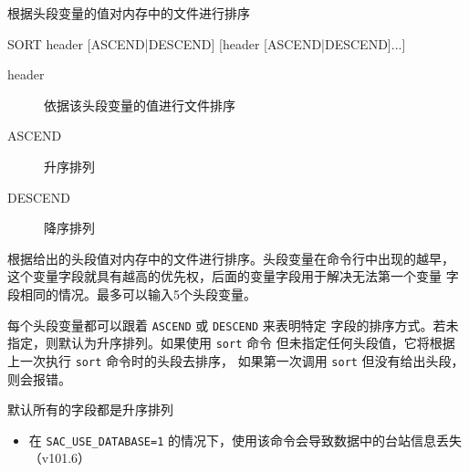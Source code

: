 \label{cmd:sort}

根据头段变量的值对内存中的文件进行排序

\begin{SACSTX}
SORT header [ASCEND|DESCEND] [header [ASCEND|DESCEND]...]
\end{SACSTX}

\begin{description}
\item [header] 依据该头段变量的值进行文件排序
\item [ASCEND] 升序排列
\item [DESCEND] 降序排列
\end{description}

根据给出的头段值对内存中的文件进行排序。头段变量在命令行中出现的越早，
这个变量字段就具有越高的优先权，后面的变量字段用于解决无法第一个变量
字段相同的情况。最多可以输入5个头段变量。

每个头段变量都可以跟着 \texttt{ASCEND} 或 \texttt{DESCEND} 来表明特定
字段的排序方式。若未指定，则默认为升序排列。如果使用 \texttt{sort} 命令
但未指定任何头段值，它将根据上一次执行 \texttt{sort} 命令时的头段去排序，
如果第一次调用 \texttt{sort} 但没有给出头段，则会报错。

默认所有的字段都是升序排列

\begin{itemize}
\item 在 \verb|SAC_USE_DATABASE=1| 的情况下，使用该命令会导致数据中的台站信息丢失（v101.6）
\end{itemize}
